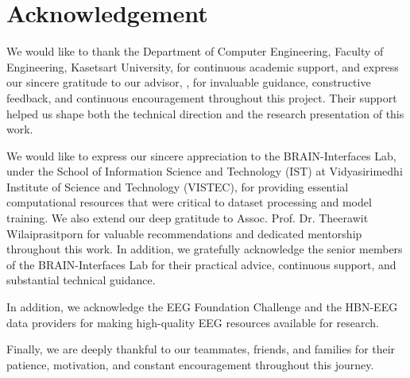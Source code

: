 \chapter*{Acknowledgement}
\label{chap:acknowledgement}

We would like to thank the Department of Computer Engineering, Faculty of Engineering, Kasetsart University, for continuous academic support, and express our sincere gratitude to our advisor, \srsAdvisorName, for invaluable guidance, constructive feedback, and continuous encouragement throughout this project. Their support helped us shape both the technical direction and the research presentation of this work.

We would like to express our sincere appreciation to the BRAIN-Interfaces Lab, under the School of Information Science and Technology (IST) at Vidyasirimedhi Institute of Science and Technology (VISTEC), for providing essential computational resources that were critical to dataset processing and model training. We also extend our deep gratitude to Assoc. Prof. Dr. Theerawit Wilaiprasitporn for valuable recommendations and dedicated mentorship throughout this work. In addition, we gratefully acknowledge the senior members of the BRAIN-Interfaces Lab for their practical advice, continuous support, and substantial technical guidance.

In addition, we acknowledge the EEG Foundation Challenge and the HBN-EEG data providers for making high-quality EEG resources available for research.

Finally, we are deeply thankful to our teammates, friends, and families for their patience, motivation, and constant encouragement throughout this journey.

\vspace{.2in}
\begin{flushright}
    \usevar{\srsAuthorOne} \\
    \usevar{\srsAuthorTwo} \\
    \usevar{\srsAuthorThree}
\end{flushright}